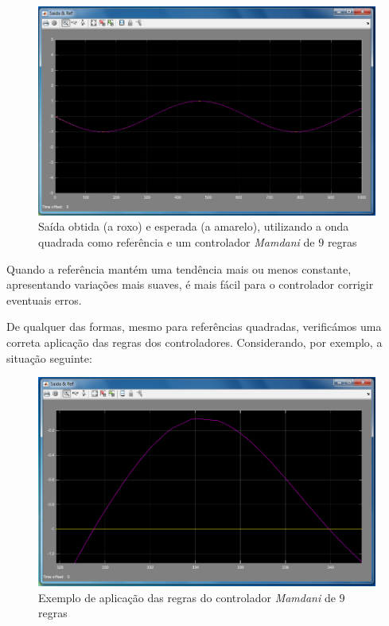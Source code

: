 \documentclass{article}
\begin{document}
\begin{figure}[h]
  \centering
      \includegraphics[scale=0.3]{Images/Mamdani_9_sin.png}
  \caption{Saída obtida (a roxo) e esperada (a amarelo), utilizando a onda quadrada como referência e um controlador \emph{Mamdani} de $9$ regras}
\end{figure}

Quando a referência mantém uma tendência mais ou menos constante, apresentando variações mais suaves, é mais fácil para o controlador corrigir eventuais erros.

De qualquer das formas, mesmo para referências quadradas, verificámos uma correta aplicação das regras dos controladores. Considerando, por exemplo, a situação seguinte:

\begin{figure}[H]
  \centering
      \includegraphics[scale=0.3]{Images/Mamdani_9_square_zoom.png}
  \caption{Exemplo de aplicação das regras do controlador \emph{Mamdani} de $9$ regras}
\end{figure}
\end{document}
